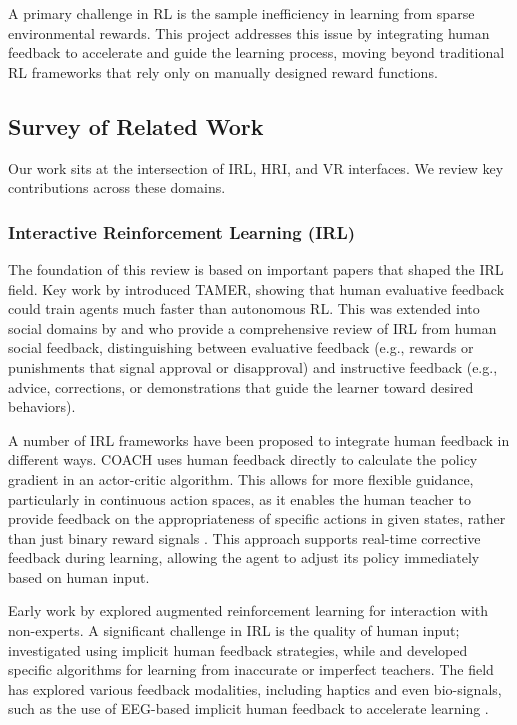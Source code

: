 \documentclass[rnd]{mas_proposal}
\begin{document}
A primary challenge in RL is the sample inefficiency in learning from sparse environmental rewards. This project addresses this issue by integrating human feedback to accelerate and guide the learning process, moving beyond traditional RL frameworks that rely only on manually designed reward functions.

\subsection{Survey of Related Work}
Our work sits at the intersection of IRL, HRI, and VR interfaces. We review key contributions across these domains.

\subsubsection{Interactive Reinforcement Learning (IRL)}
The foundation of this review is based on important papers that shaped the IRL field. Key work by \citet{BradleyKnox2008} introduced TAMER, showing that human evaluative feedback could train agents much faster than autonomous RL. This was extended into social domains by \citet{Lin2020a} and \citet{Lin2020} who provide a comprehensive review of IRL from human social feedback, distinguishing between evaluative feedback (e.g., rewards or punishments that signal approval or disapproval) and instructive feedback (e.g., advice, corrections, or demonstrations that guide the learner toward desired behaviors). 

A number of IRL frameworks have been proposed to integrate human feedback in different ways. COACH uses human feedback directly to calculate the policy gradient in an actor-critic algorithm. This allows for more flexible guidance, particularly in continuous action spaces, as it enables the human teacher to provide feedback on the appropriateness of specific actions in given states, rather than just binary reward signals \citep{Lin2020}. This approach supports real-time corrective feedback during learning, allowing the agent to adjust its policy immediately based on human input.

Early work by \citet{6147010} explored augmented reinforcement learning for interaction with non-experts. A significant challenge in IRL is the quality of human input; \citet{Loftin2014} investigated using implicit human feedback strategies, while \citet{Faulkner2020} and \citet{KesslerFaulkner2021} developed specific algorithms for learning from inaccurate or imperfect teachers. The field has explored various feedback modalities, including haptics \citep{10490256} and even bio-signals, such as the use of EEG-based implicit human feedback to accelerate learning \citep{Xu2021}.
\end{document}

